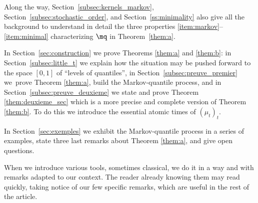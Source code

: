 Along the way, Section~\ref{subsec:kernels_markov}, Section~\ref{subsec:stochastic_order}, and Section~\ref{ss:minimality} also give all the background to understand in detail the three properties \eqref{item:markov}--\eqref{item:minimal} characterizing $\mq$ in Theorem~\ref{them:a}.

In Section~\ref{sec:construction} we prove Theorems \ref{them:a} and \ref{them:b}: in Section~\ref{subsec:little_t} we explain how the situation may be pushed forward to the space $[0,1]$ of ``levels of quantiles'', in Section~\ref{subsec:preuve_premier} we~prove Theorem \ref{them:a}, \ie build the Markov-quantile process, and in Section~\ref{subsec:preuve_deuxieme} we state and prove Theorem \ref{them:deuxieme_sec} which is a more precise and complete version of Theorem \ref{them:b}. To do this we introduce the essential atomic times of $(\mu_t)_t$.

In Section~\ref{sec:exemples} we exhibit the Markov-quantile process in a series of examples, state three last remarks about Theorem \ref{them:a}, and give open questions.

\begin{note} When we introduce various tools, sometimes classical, we do it in a way and with remarks adapted to our context. The reader already knowing them may read quickly, taking notice of our few specific remarks, which are useful in the rest of the article.
\end{note}

